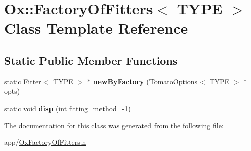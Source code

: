 \hypertarget{class_ox_1_1_factory_of_fitters}{\section{Ox\-:\-:Factory\-Of\-Fitters$<$ T\-Y\-P\-E $>$ Class Template Reference}
\label{class_ox_1_1_factory_of_fitters}
}
\subsection*{Static Public Member Functions}
\begin{DoxyCompactItemize}
\item 
\hypertarget{class_ox_1_1_factory_of_fitters_aeec858b4bf98eb6f7915ead00c3ede10}{static \hyperlink{class_ox_1_1_fitter}{Fitter}$<$ T\-Y\-P\-E $>$ $\ast$ {\bfseries new\-By\-Factory} (\hyperlink{struct_ox_1_1_tomato_options}{Tomato\-Options}$<$ T\-Y\-P\-E $>$ $\ast$opts)}\label{class_ox_1_1_factory_of_fitters_aeec858b4bf98eb6f7915ead00c3ede10}

\item 
\hypertarget{class_ox_1_1_factory_of_fitters_a6f4628503a36526335597d984be929f0}{static void {\bfseries disp} (int fitting\-\_\-method=-\/1)}\label{class_ox_1_1_factory_of_fitters_a6f4628503a36526335597d984be929f0}

\end{DoxyCompactItemize}


The documentation for this class was generated from the following file\-:\begin{DoxyCompactItemize}
\item 
app/\hyperlink{_ox_factory_of_fitters_8h}{Ox\-Factory\-Of\-Fitters.\-h}\end{DoxyCompactItemize}
